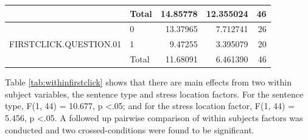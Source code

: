 \documentclass[a4paper]{article}
\begin{document}
\begin{table}[H]
\begin{tabular}{|l|l|r|r|r|}
\cline{2-5}
                                         & Total & 14.85778                  & 12.355024                           & 46                      \\ 
\hline
\multirow{3}{*}{FIRSTCLICK.QUESTION.01}  & 0     & 13.37965                  & 7.712741                            & 26                      \\ 
\cline{2-5}
                                         & 1     & 9.47255                   & 3.395079                            & 20                      \\ 
\cline{2-5}
                                         & Total & 11.68091                  & 6.461390                            & 46                      \\
\hline
\end{tabular}
\end{table}


Table \ref{tab:withinfirstclick} shows that there are main effects from two within subject variables, the sentence type and stress location factors. For the sentence type, F(1, 44) =  10.677, p \textless .05; and for the stress location factor, F(1, 44) = 5.456, p \textless .05. A followed up pairwise comparison of within subjects factors was conducted and two crossed-conditions were found to be significant.

\end{document}
